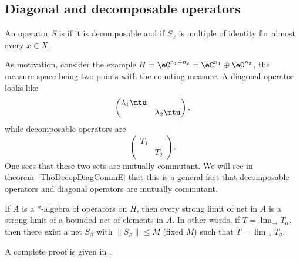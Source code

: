 					\subsection{Diagonal and decomposable operators}



An operator $S$ is  if it is decomposable and if $S_x$ is multiple of identity for almost every $x\in X$.

As motivation, consider the example $H=\eC^{n_1+n_2}=\eC^{n_1}\oplus\eC^{n_2}$, the measure space being two points with the counting measure. A diagonal operator looks like
\begin{equation}
	\begin{pmatrix}
	  \lambda_1\mtu	&		\\
		&	\lambda_2\mtu
	\end{pmatrix},
\end{equation}
while decomposable operators are
\begin{equation}
	\begin{pmatrix}
	 		 T_1	&		\\
			&	T_2
	\end{pmatrix}.
\end{equation}
One sees that these two sets are mutually commutant. We will see in theorem~\ref{ThoDecopDiagCommE} that this is a general fact that decomposable operators and diagonal operators are mutually commutant.

\begin{theorem}		\label{ThoKaplanskyDensity}
	If $A$ is a $*$-algebra of operators on $H$, then every strong limit of net in $A$ is a strong limit of a bounded net of elements in $A$. In other words, if $T=\lim_{\rightarrow}T_{\alpha}$, then there exist a net $S_{\beta}$ with $\| S_{\beta} \|\leq M$ (fixed $M$) such that $T=\lim_{\rightarrow}T_{\beta}$.
\end{theorem}

A complete proof is given in \cite{JonesVN}.

